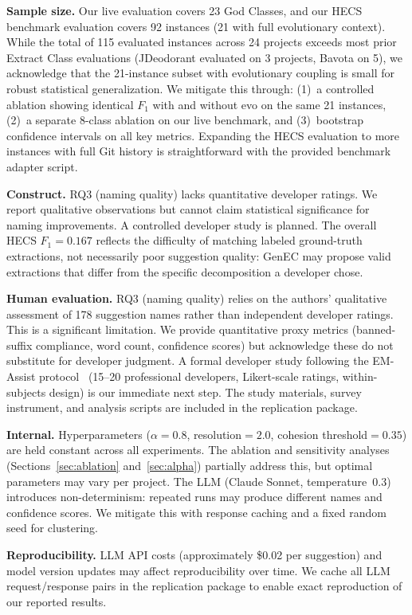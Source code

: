 \documentclass[sigconf]{acmart}
\begin{document}
\textbf{Sample size.}  Our live evaluation covers 23 God Classes, and our
HECS benchmark evaluation covers 92 instances (21 with full evolutionary
context). While the total of 115 evaluated instances across 24 projects
exceeds most prior Extract Class evaluations (JDeodorant evaluated on 3
projects, Bavota on 5), we acknowledge that the 21-instance subset with
evolutionary coupling is small for robust statistical generalization. We
mitigate this through: (1)~a controlled ablation showing identical $F_1$
with and without evo on the same 21 instances, (2)~a separate 8-class
ablation on our live benchmark, and (3)~bootstrap confidence intervals on
all key metrics. Expanding the HECS evaluation to more instances with full
Git history is straightforward with the provided benchmark adapter script.

\textbf{Construct.}  RQ3 (naming quality) lacks quantitative developer ratings.
We report qualitative observations but cannot claim statistical significance
for naming improvements. A controlled developer study is planned. The overall
HECS $F_1{=}0.167$ reflects the difficulty of matching labeled ground-truth
extractions, not necessarily poor suggestion quality: GenEC may propose valid
extractions that differ from the specific decomposition a developer chose.

\textbf{Human evaluation.}  RQ3 (naming quality) relies on the authors'
qualitative assessment of 178 suggestion names rather than independent
developer ratings. This is a significant limitation. We provide quantitative
proxy metrics (banned-suffix compliance, word count, confidence scores) but
acknowledge these do not substitute for developer judgment. A formal developer
study following the EM-Assist protocol~\cite{Pomian2024EMAssist} (15--20
professional developers, Likert-scale ratings, within-subjects design) is our
immediate next step. The study materials, survey instrument, and analysis
scripts are included in the replication package.

\textbf{Internal.}  Hyperparameters ($\alpha{=}0.8$, resolution${}=2.0$,
cohesion threshold${}=0.35$) are held constant across all experiments. The
ablation and sensitivity analyses (Sections~\ref{sec:ablation}
and~\ref{sec:alpha}) partially address this, but optimal parameters may vary
per project. The LLM (Claude Sonnet, temperature~0.3) introduces
non-determinism: repeated runs may produce different names and confidence
scores. We mitigate this with response caching and a fixed random seed for
clustering.

\textbf{Reproducibility.}  LLM API costs (approximately \$0.02 per suggestion)
and model version updates may affect reproducibility over time. We cache all
LLM request/response pairs in the replication package to enable exact
reproduction of our reported results.
\end{document}
